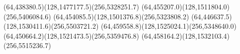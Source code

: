 {(64,438380.5)(128,1477177.5)(256,5328251.7)}
{(64,455207.0)(128,1511804.0)(256,5406084.6)}
{(64,454085.5)(128,1501376.8)(256,5323808.2)}
{(64,446637.5)(128,1530411.6)(256,5503721.2)}
{(64,459558.8)(128,1525024.1)(256,5348640.0)}
{(64,450664.2)(128,1521473.5)(256,5359476.8)}
{(64,458164.2)(128,1532103.4)(256,5515236.7)}